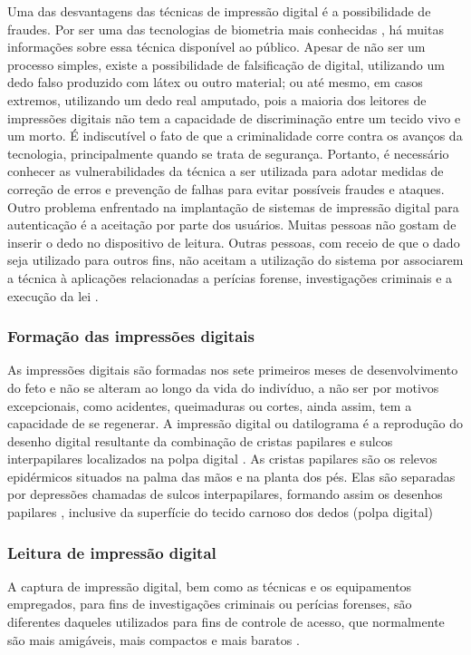  Uma das desvantagens das técnicas de impressão digital é a possibilidade de fraudes. Por ser uma das tecnologias de biometria mais conhecidas \cite{bosworth2014computer}, há muitas informações sobre essa técnica disponível ao público. Apesar de não ser um processo simples, existe a possibilidade de falsificação de digital, utilizando um dedo falso produzido com látex ou outro material; ou até mesmo, em casos extremos, utilizando um dedo real amputado, pois a maioria dos leitores de impressões digitais não tem a capacidade de discriminação entre um tecido vivo e um morto. É indiscutível o fato de que a criminalidade corre contra os avanços da tecnologia, principalmente quando se trata de segurança. Portanto, é necessário conhecer as vulnerabilidades da técnica a ser utilizada para adotar medidas de correção de erros e prevenção de falhas para evitar possíveis fraudes e ataques. Outro problema enfrentado na implantação de sistemas de impressão digital para autenticação é a aceitação por parte dos usuários. Muitas pessoas não gostam de inserir o dedo no dispositivo de leitura. Outras pessoas, com receio de que o dado seja utilizado para outros fins, não aceitam a utilização do sistema por associarem a técnica à aplicações relacionadas a perícias forense, investigações criminais e a execução da lei \cite{bosworth2014computer, maltoni2009handbook}.


\subsubsection{Formação das impressões digitais}
 As impressões digitais são formadas nos sete primeiros meses de desenvolvimento do feto e não se alteram ao longo da vida do indivíduo, a não ser por motivos excepcionais, como acidentes, queimaduras ou cortes, ainda assim, tem a capacidade de se regenerar. A impressão digital ou datilograma é a reprodução do desenho digital resultante da combinação de cristas papilares e sulcos interpapilares localizados na polpa digital \cite{tavares1991papiloscopia}. As cristas papilares são os relevos epidérmicos situados na palma das mãos e na planta dos pés. Elas são separadas por depressões chamadas de sulcos interpapilares, formando assim os desenhos papilares \cite{couto2009segredos, holder2011fingerprint}, inclusive da superfície do tecido carnoso dos dedos (polpa digital)

\subsubsection{Leitura de impressão digital}
  A captura de impressão digital, bem como as técnicas e os equipamentos empregados, para fins de investigações criminais ou perícias forenses, são diferentes daqueles utilizados para fins de controle de acesso, que normalmente são mais amigáveis, mais compactos e mais baratos \cite{maltoni2009handbook}.


